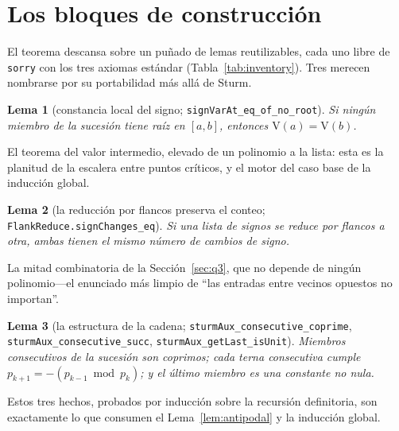 \documentclass[11pt]{article}
\newtheorem{lemma}{Lema}
\newcommand{\lean}[1]{\texttt{#1}}
\newcommand{\V}{\mathrm{V}}
\begin{document}
\section{Los bloques de construcci\'on}\label{sec:blocks}

El teorema descansa sobre un pu\~nado de lemas reutilizables, cada uno libre de \lean{sorry} con los
tres axiomas est\'andar (Tabla~\ref{tab:inventory}). Tres merecen nombrarse por su portabilidad m\'as
all\'a de Sturm.

\begin{lemma}[constancia local del signo; \lean{signVarAt\_eq\_of\_no\_root}]
Si ning\'un miembro de la sucesi\'on tiene ra\'iz en $[a,b]$, entonces $\V(a)=\V(b)$.
\end{lemma}
El teorema del valor intermedio, elevado de un polinomio a la lista: esta es la planitud de la
escalera entre puntos cr\'iticos, y el motor del caso base de la inducci\'on global.

\begin{lemma}[la reducci\'on por flancos preserva el conteo; \lean{FlankReduce.signChanges\_eq}]
Si una lista de signos se reduce por flancos a otra, ambas tienen el mismo n\'umero de cambios de
signo.
\end{lemma}
La mitad combinatoria de la Secci\'on~\ref{sec:q3}, que no depende de ning\'un polinomio---el
enunciado m\'as limpio de ``las entradas entre vecinos opuestos no importan''.

\begin{lemma}[la estructura de la cadena; \lean{sturmAux\_consecutive\_coprime}, \lean{sturmAux\_consecutive\_succ}, \lean{sturmAux\_getLast\_isUnit}]
Miembros consecutivos de la sucesi\'on son coprimos; cada terna consecutiva cumple
$p_{k+1}=-(p_{k-1}\bmod p_k)$; y el \'ultimo miembro es una constante no nula.
\end{lemma}
Estos tres hechos, probados por inducci\'on sobre la recursi\'on definitoria, son exactamente lo que
consumen el Lema~\ref{lem:antipodal} y la inducci\'on global.
\end{document}
